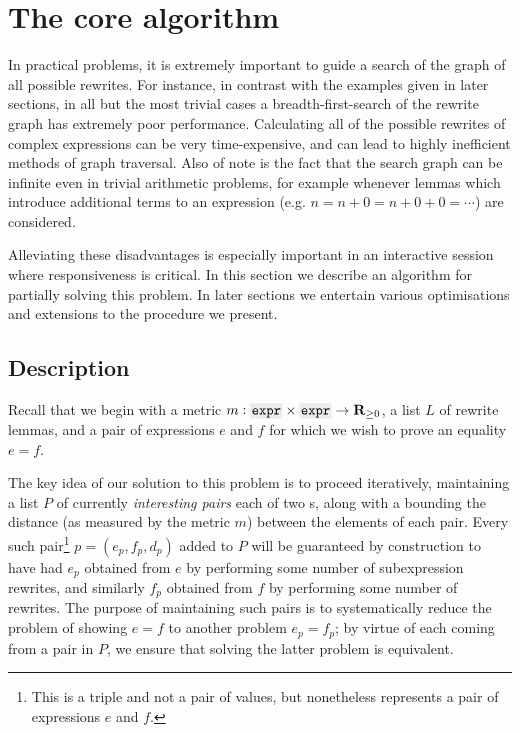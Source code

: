 \documentclass[12pt]{article}
\begin{document}
\section{The core algorithm}

In practical problems, it is extremely important to guide a search of the graph of all possible rewrites. For instance, in contrast with the examples given in later sections, in all but the most trivial cases a breadth-first-search of the rewrite graph has extremely poor performance. Calculating all of the possible rewrites of complex expressions can be very time-expensive, and can lead to highly inefficient methods of graph traversal. Also of note is the fact that the search graph can be infinite even in trivial arithmetic problems, for example whenever lemmas which introduce additional terms to an expression (e.g. $n = n + 0 = n + 0 + 0 = \cdots$) are considered.

Alleviating these disadvantages is especially important in an interactive session where responsiveness is critical. In this section we describe an algorithm for partially solving this problem. In later sections we entertain various optimisations and extensions to the procedure we present.

\subsection{Description}

Recall that we begin with a metric $m : \expr{} \times \expr{} \to \RR_{\geq 0}$, a list $L$ of rewrite lemmas, and a pair of expressions $e$ and $f$ for which we wish to prove an equality $e = f$.

The key idea of our solution to this problem is to proceed iteratively, maintaining a list $P$ of currently \textit{interesting pairs} each of two \expr{}s, along with a  bounding the distance (as measured by the metric $m$) between the elements of each pair. Every such pair\footnote{This is a triple and not a pair of values, but nonetheless represents a pair of expressions $e$ and $f$.} $p = (e_p, f_p, d_p)$ added to $P$ will be guaranteed by construction to have had $e_p$ obtained from $e$ by performing some number of subexpression rewrites, and similarly $f_p$ obtained from $f$ by performing some number of rewrites. The purpose of maintaining such pairs is to systematically reduce the problem of showing $e = f$ to another problem $e_p = f_p$; by virtue of each coming from a pair in $P$, we ensure that solving the latter problem is equivalent.
\end{document}
